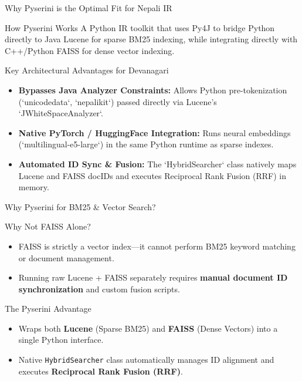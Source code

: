 \documentclass[aspectratio=169]{beamer}
\begin{document}
\begin{frame}{Why Pyserini is the Optimal Fit for Nepali IR}
  \begin{block}{How Pyserini Works}
    A Python IR toolkit that uses Py4J to bridge Python directly to Java Lucene for sparse BM25 indexing, while integrating directly with C++/Python FAISS for dense vector indexing.
  \end{block}

  \vspace{0.2cm}
  \begin{block}{Key Architectural Advantages for Devanagari}
    \begin{itemize}
      \item \textbf{Bypasses Java Analyzer Constraints:} Allows Python pre-tokenization (`unicodedata`, `nepalikit`) passed directly via Lucene’s `JWhiteSpaceAnalyzer`.
      \item \textbf{Native PyTorch / HuggingFace Integration:} Runs neural embeddings (`multilingual-e5-large`) in the same Python runtime as sparse indexes.
      \item \textbf{Automated ID Sync \& Fusion:} The `HybridSearcher` class natively maps Lucene and FAISS docIDs and executes Reciprocal Rank Fusion (RRF) in memory.
    \end{itemize}
  \end{block}
\end{frame}

\begin{frame}{Why Pyserini for BM25 \& Vector Search?}
  \begin{block}{Why Not FAISS Alone?}
    \begin{itemize}
      \item FAISS is strictly a vector index—it cannot perform BM25 keyword matching or document management.
      \item Running raw Lucene + FAISS separately requires \textbf{manual document ID synchronization} and custom fusion scripts.
    \end{itemize}
  \end{block}
  \vspace{0.2cm}
  \begin{block}{The Pyserini Advantage}
    \begin{itemize}
      \item Wraps both \textbf{Lucene} (Sparse BM25) and \textbf{FAISS} (Dense Vectors) into a single Python interface.
      \item Native \texttt{HybridSearcher} class automatically manages ID alignment and executes \textbf{Reciprocal Rank Fusion (RRF)}.
    \end{itemize}
  \end{block}
\end{frame}
\end{document}
